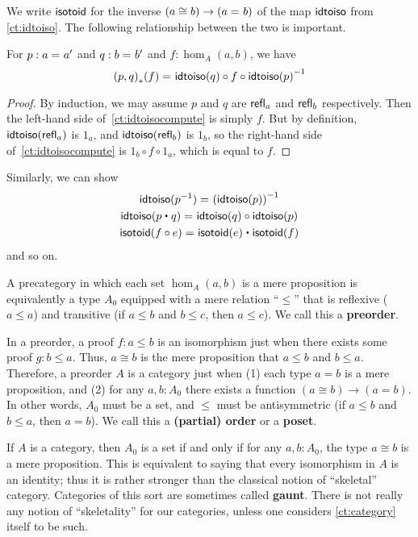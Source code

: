 We write $\mathsf{isotoid}$ for the inverse $(a\cong b) \to (a =_{} b)$ of the map $\mathsf{idtoiso}$ from \autoref{ct:idtoiso}.
The following relationship between the two is important.

\begin{lem}\label{ct:idtoiso-trans}
  For $p:a =_{} a'$ and $q:b =_{} b'$ and $f:\hom_A(a,b)$, we have
  \begin{equation}\label{ct:idtoisocompute}
    \id{\trans{(p,q)}{f}}
    {\idtoiso(q)\circ f \circ \inv{\idtoiso(p)}}
  \end{equation}
\end{lem}
\begin{proof}
  By induction, we may assume $p$ and $q$ are $\mathsf{refl}_{a}$ and $\mathsf{refl}_{b}$ respectively.
Then the left-hand side of~\eqref{ct:idtoisocompute} is simply $f$.
  But by definition, $\mathsf{idtoiso}(\mathsf{refl}_{a})$ is $1_a$, and $\mathsf{idtoiso}(\mathsf{refl}_{b})$ is $1_b$, so the right-hand side of~\eqref{ct:idtoisocompute} is $1_b\circ f\circ 1_a$, which is equal to $f$.
\end{proof}

Similarly, we can show
\begin{gather}
  \id{\idtoiso(\rev p)}{\inv {(\idtoiso(p))}}\\
  \id{\idtoiso(p\ct q)}{\idtoiso(q)\circ \idtoiso(p)}\\
  \id{\isotoid(f\circ e)}{\isotoid(e)\ct \isotoid(f)}
\end{gather}
and so on.

\begin{eg}\label{ct:orders}
  A precategory in which each set $\hom_A(a,b)$ is a mere proposition is equivalently a type $A_0$ equipped with a mere relation ``$\le$'' that is reflexive ($a\le a$) and transitive (if $a\le b$ and $b\le c$, then $a\le c$).
  We call this a \textbf{preorder}.

  In a preorder, a proof $f\colon a\le b$ is an isomorphism just when there exists some proof $g\colon b\le a$.
  Thus, $a\cong b$ is the mere proposition that $a\le b$ and $b\le a$.
  Therefore, a preorder $A$ is a category just when (1) each type $a=b$ is a mere proposition, and (2) for any $a,b:A_0$ there exists a function $(a\cong b) \to (a=b)$.
  In other words, $A_0$ must be a set, and $\le$ must be antisymmetric (if $a\le b$ and $b\le a$, then $a=b$).
  We call this a \textbf{(partial) order} or a \textbf{poset}.
\end{eg}

\begin{eg}\label{ct:gaunt}
  If $A$ is a category, then $A_0$ is a set if and only if for any $a,b:A_0$, the type $a\cong b$ is a mere proposition.
  This is equivalent to saying that every isomorphism in $A$ is an identity; thus it is rather stronger than the classical notion of ``skeletal'' category.
  Categories of this sort are sometimes called \textbf{gaunt}.
  There is not really any notion of ``skeletality'' for our categories, unless one considers \autoref{ct:category} itself to be such.
\end{eg}

